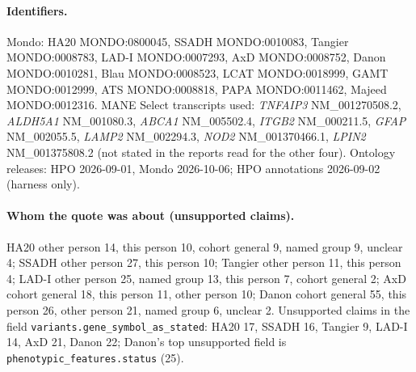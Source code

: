 \documentclass{article} %
\begin{document}
\begin{table}[h]
\caption{Registered six: extraction detail. ``Worst 3'' is the share of the disease's unsupported claims held by its three worst papers.}
\begin{center}
\scriptsize
{}
\end{center}
\end{table}

\paragraph{Identifiers.} Mondo: HA20 MONDO:0800045, SSADH MONDO:0010083, Tangier MONDO:0008783, LAD-I MONDO:0007293, AxD MONDO:0008752, Danon MONDO:0010281, Blau MONDO:0008523, LCAT MONDO:0018999, GAMT MONDO:0012999, ATS MONDO:0008818, PAPA MONDO:0011462, Majeed MONDO:0012316. MANE Select transcripts used: \emph{TNFAIP3} NM\_001270508.2, \emph{ALDH5A1} NM\_001080.3, \emph{ABCA1} NM\_005502.4, \emph{ITGB2} NM\_000211.5, \emph{GFAP} NM\_002055.5, \emph{LAMP2} NM\_002294.3, \emph{NOD2} NM\_001370466.1, \emph{LPIN2} NM\_001375808.2 (not stated in the reports read for the other four). Ontology releases: HPO 2026-09-01, Mondo 2026-10-06; HPO annotations 2026-09-02 (harness only).

\paragraph{Whom the quote was about (unsupported claims).} HA20 other person 14, this person 10, cohort general 9, named group 9, unclear 4; SSADH other person 27, this person 10; Tangier other person 11, this person 4; LAD-I other person 25, named group 13, this person 7, cohort general 2; AxD cohort general 18, this person 11, other person 10; Danon cohort general 55, this person 26, other person 21, named group 6, unclear 2. Unsupported claims in the field \texttt{variants.gene\_symbol\_as\_stated}: HA20 17, SSADH 16, Tangier 9, LAD-I 14, AxD 21, Danon 22; Danon's top unsupported field is \texttt{phenotypic\_features.status} (25).
\end{document}
